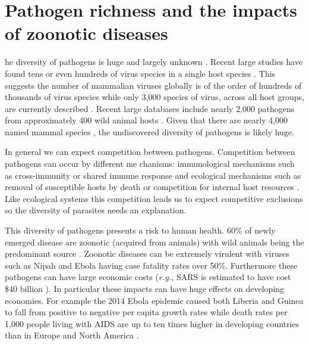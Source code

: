 
\section{Pathogen richness and the impacts of zoonotic diseases}



he diversity of pathogens is huge and largely unknown \cite{poulin2014parasite}.
Recent large studies have found tens \cite{anthony2013strategy} or even hundreds of virus species in a single host species \cite{anthony2015non}.
This suggests the number of mammalian viruses globally is of the order of hundreds of thousands of virus species \cite{anthony2013strategy} while only 3,000 species of virus, across all host groups, are currently described \cite{ICTV}.
Recent large databases include nearly 2,000 pathogens from approximately 400 wild animal hosts \cite{wardeh2015database}.
Given that there are nearly 4,000 named mammal species \cite{wilson2005mammal}, the undiscovered diversity of pathogens is likely huge.

In general we can expect competition between pathogens.
Competition between pathogens can occur by different me	chanisms: immunological mechanisms such as cross-immunity or shared immune response \cite{fenton2010applying} and ecological mechanisms such as removal of susceptible hosts by death \cite{rohani2003ecological} or competition for internal host resources \cite{griffiths2014analysis}.
Like ecological systems this competition leads us to expect competitive exclusions \cite{bremermann1989competitive, martcheva2013competitive, ackleh2003competitive, ackleh2014robust, turner2002impact} so the diversity of parasites needs an explanation.


This diversity of pathogens presents a risk to human health.
60\% of newly emerged disease are zoonotic (acquired from animals) with wild animals being the predominant source \cite{jones2008global, woolhouse2006host, taylor2001risk}.
Zoonotic diseases can be extremely virulent with viruses such as Nipah \cite{luby2009recurrent} and Ebola \cite{lefebvre2014case} having case fatality rates over 50\%.
Furthermore these pathogens can have large economic costs (\emph{e.g.}, SARS is estimated to have cost \$40 billion \cite{knobler2004learning}).
In particular these impacts can have huge effects on developing economies.
For example the 2014 Ebola epidemic caused both Liberia and Guinea to fall from positive to negative per capita growth rates \cite{ebolaWorldbank, ebola2015worldbank} while death rates per 1,000 people living with AIDS are up to ten times higher in developing countries than in Europe and North America \cite{granich2015trends}.



